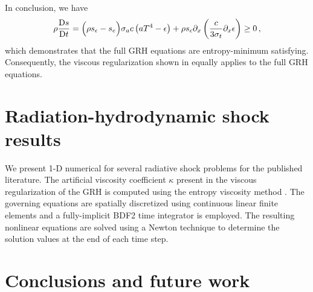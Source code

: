 \documentclass{mc2015}
\begin{document}
In conclusion, we have 
\begin{equation} 
\rho \frac{\textrm{D} s}{\textrm{D} t} = \Big( \rho s_\epsilon -s_e \Big)  \sigma_a c \left( a T^4 - \epsilon \right) +   \rho s_\epsilon \partial_x \left( \frac{c}{3 \sigma_t} \partial_x \epsilon \right) \geq 0 \,,
\end{equation}
which demonstrates that the full GRH equations are entropy-minimum satisfying. Consequently, the viscous regularization shown in  equally applies to the full GRH equations. 

\section{Radiation-hydrodynamic shock results}\label{sec:rez}
%
We present 1-D numerical for several radiative shock problems for the published literature. The artificial viscosity coefficient $\kappa$ present in the viscous regularization of the GRH is computed using the entropy viscosity method \cite{jlg1,jlg2,our_jcp_paper}. The governing equations are spatially discretized using continuous linear finite elements and a fully-implicit BDF2 time integrator is employed. The resulting nonlinear equations are solved using a Newton technique to determine the solution values at the end of each time step. 


%
\section{Conclusions and future work}\label{sec:conclusion}
%




\setlength{\baselineskip}{12pt}



\end{document}
